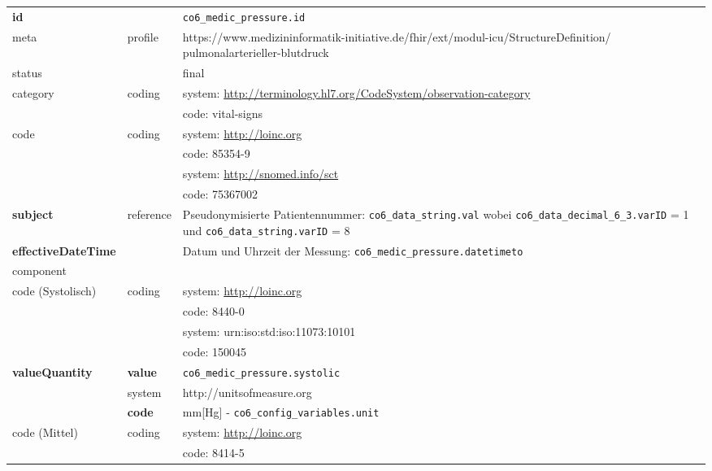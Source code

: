 \begin{longtable}{|l|l|p{7.5cm}|}
        \hline
        \rowcolor{lightgray} \multicolumn{3}{|l|}{Data Mapping (inhaltlich)} \\ \hline
        \textbf{id} &  & \texttt{co6\_medic\_pressure.id} \\ \hline
	meta & profile & https://www.medizininformatik-initiative.de/fhir/ext/modul-icu/StructureDefinition/
	pulmonalarterieller-blutdruck \\ \hline 
	status & & final  \\ \hline 
	category & coding & system: \url{http://terminology.hl7.org/CodeSystem/observation-category} \\ 
\cline{3-3}
        & & code: vital-signs \\ \hline
        code & coding & system: \url{http://loinc.org} \\ 
        \cline{3-3} 
        &  & code: 85354-9 \\ 
        \cline{3-3}
        &  & system: \url{http://snomed.info/sct} \\ 
        \cline{3-3} 
        &  & code: 75367002 \\ \hline
        \textbf{subject} & reference & Pseudonymisierte Patientennummer: \texttt{co6\_data\_string.val} wobei \texttt{co6\_data\_decimal\_6\_3.varID} = 1 und \texttt{co6\_data\_string.varID} = 8 \\ \hline
        \textbf{effectiveDateTime} & & Datum und Uhrzeit der Messung:  \texttt{co6\_medic\_pressure.datetimeto} \\ \hline
	\multicolumn{3}{|l|}{component} \\ \hline
	code (Systolisch) & coding & system: \url{http://loinc.org} \\ 
	\cline{3-3} 
	&  & code: 8440-0 \\ 
	\cline{3-3} 
	&  & system: urn:iso:std:iso:11073:10101 \\ 
	\cline{3-3}
	&  & code: 150045 \\ \hline
	\textbf{valueQuantity} & \textbf{value} & \texttt{co6\_medic\_pressure.systolic} \\
	\cline{2-3}
	& system & http://unitsofmeasure.org \\ 
	\cline{2-3}
	& \textbf{code} & mm[Hg] - \texttt{co6\_config\_variables.unit} \\ \hline
	code (Mittel) & coding & system: \url{http://loinc.org} \\ 
	\cline{3-3} 
	&  & code: 8414-5 \\ 
	\cline{3-3} 

\end{longtable}
